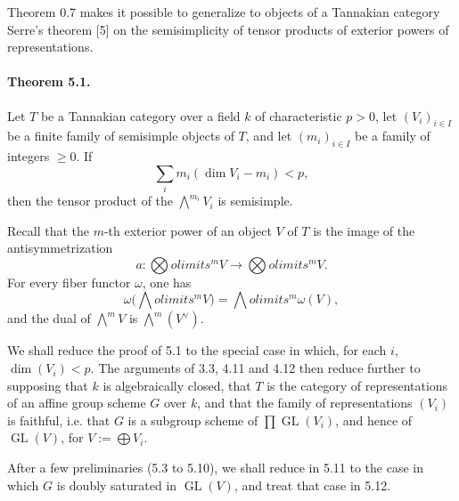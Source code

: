 \documentclass[11pt]{article}
\newcommand{\GL}{\operatorname{GL}}
\theoremstyle{plain}
\theoremstyle{definition}
\begin{document}
Theorem 0.7 makes it possible to generalize to objects of a Tannakian category Serre's theorem [5] on the semisimplicity of tensor products of exterior powers of representations.

\paragraph{Theorem 5.1.} Let $T$ be a Tannakian category over a field $k$ of characteristic $p>0$, let $(V_i)_{i\in I}$ be a finite family of semisimple objects of $T$, and let $(m_i)_{i\in I}$ be a family of integers $\ge0$. If
\begin{equation}\tag{5.1.1}
   \sum_i m_i(\dim V_i-m_i)<p,
\end{equation}
then the tensor product of the $\bigwedge^{m_i}V_i$ is semisimple.

Recall that the $m$-th exterior power of an object $V$ of $T$ is the image of the antisymmetrization
\[
   a:\bigotimes
olimits^m V\longrightarrow\bigotimes
olimits^m V.
\]
For every fiber functor $\omega$, one has
\[
   \omega\bigl(\bigwedge
olimits^m V\bigr)=\bigwedge
olimits^m\omega(V),
\]
and the dual of $\bigwedge^m V$ is $\bigwedge^m(V^\vee)$.

We shall reduce the proof of 5.1 to the special case in which, for each $i$, $\dim(V_i)<p$. The arguments of 3.3, 4.11 and 4.12 then reduce further to supposing that $k$ is algebraically closed, that $T$ is the category of representations of an affine group scheme $G$ over $k$, and that the family of representations $(V_i)$ is faithful, i.e. that $G$ is a subgroup scheme of $\prod \GL(V_i)$, and hence of $\GL(V)$, for $V:=\bigoplus V_i$.

After a few preliminaries (5.3 to 5.10), we shall reduce in 5.11 to the case in which $G$ is doubly saturated in $\GL(V)$, and treat that case in 5.12.
\end{document}
